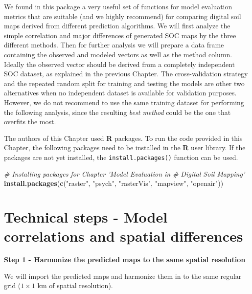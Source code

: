 \documentclass[10pt,b5paper,]{book}
\newenvironment{Shaded}{\begin{snugshade}}{\end{snugshade}}
\newcommand{\CommentTok}[1]{\textcolor[rgb]{0.56,0.35,0.01}{\textit{#1}}}
\newcommand{\KeywordTok}[1]{\textcolor[rgb]{0.13,0.29,0.53}{\textbf{#1}}}
\newcommand{\NormalTok}[1]{#1}
\newcommand{\StringTok}[1]{\textcolor[rgb]{0.31,0.60,0.02}{#1}}
\theoremstyle{definition}
\theoremstyle{definition}
\theoremstyle{definition}
\theoremstyle{remark}
\begin{document}
We found in this package a very useful set of functions for model
evaluation metrics that are suitable (and we highly recommend) for
comparing digital soil maps derived from different prediction
algorithms. We will first analyze the simple correlation and major
differences of generated SOC maps by the three different methods. Then
for further analysis we will prepare a data frame containing the
observed and modeled vectors as well as the method column. Ideally the
observed vector should be derived from a completely independent SOC
dataset, as explained in the previous Chapter. The cross-validation
strategy and the repeated random split for training and testing the
models are other two alternatives when no independent dataset is
available for validation purposes. However, we do not recommend to use
the same training dataset for performing the following analysis, since
the resulting \emph{best method} could be the one that overfits the
most.

The authors of this Chapter used \textbf{R} packages. To run the code
provided in this Chapter, the following packages need to be installed in
the \textbf{R} user library. If the packages are not yet installed, the
\texttt{install.packages()} function can be used.

\begin{Shaded}
\begin{Highlighting}[]
\CommentTok{# Installing packages for Chapter 'Model Evaluation in}
\CommentTok{# Digital Soil Mapping'}
\KeywordTok{install.packages}\NormalTok{(}\KeywordTok{c}\NormalTok{(}\StringTok{"raster"}\NormalTok{, }\StringTok{"psych"}\NormalTok{, }\StringTok{"rasterVis"}\NormalTok{,}
                   \StringTok{"mapview"}\NormalTok{, }\StringTok{"openair"}\NormalTok{))}
\end{Highlighting}
\end{Shaded}

\hypertarget{technical-steps---model-correlations-and-spatial-differences}{%
\section{Technical steps - Model correlations and spatial
differences}\label{technical-steps---model-correlations-and-spatial-differences}}

\textbf{Step 1 - Harmonize the predicted maps to the same spatial
resolution}

We will import the predicted maps and harmonize them in to the same
regular grid (\(1 \times 1\) km of spatial resolution).
\end{document}
